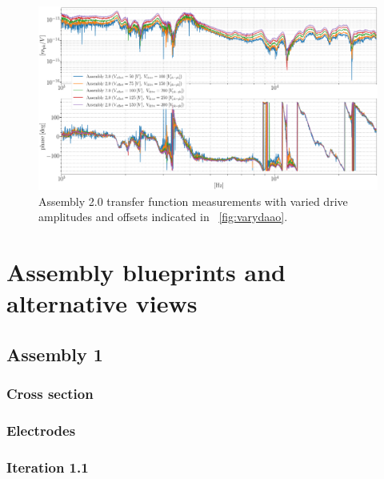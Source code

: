 \begin{figure}[H]
    \includegraphics[width=\textwidth]{figs/ALGAAS/results_figs/assembly2/vvao517.pdf} 
    \caption{Assembly 2.0 transfer function measurements with varied drive amplitudes and offsets indicated in ~\autoref{fig:varydaao}.}
    \label{fig:vvao517}
\end{figure}

\section{Assembly blueprints and alternative views}

\subsection{Assembly 1}

\subsubsection{Cross section}

\subsubsection{Electrodes}

\subsubsection{Iteration 1.1}

